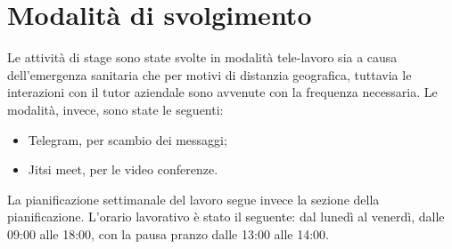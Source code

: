 \section{Modalità di svolgimento}\label{sec:modalita-di-svolgimento}
Le attività di stage sono state svolte in modalità tele-lavoro sia a causa dell'emergenza sanitaria che per motivi di distanzia geografica, tuttavia le interazioni con il tutor aziendale sono avvenute con la frequenza necessaria.
Le modalità, invece, sono state le seguenti:
\begin{itemize}
    \item Telegram, per scambio dei messaggi;
    \item Jitsi meet, per le video conferenze.
\end{itemize}
La pianificazione settimanale del lavoro segue invece la sezione della pianificazione.
L'orario lavorativo è stato il seguente: dal lunedì al venerdì, dalle 09:00 alle 18:00, con la pausa pranzo dalle 13:00 alle 14:00.
